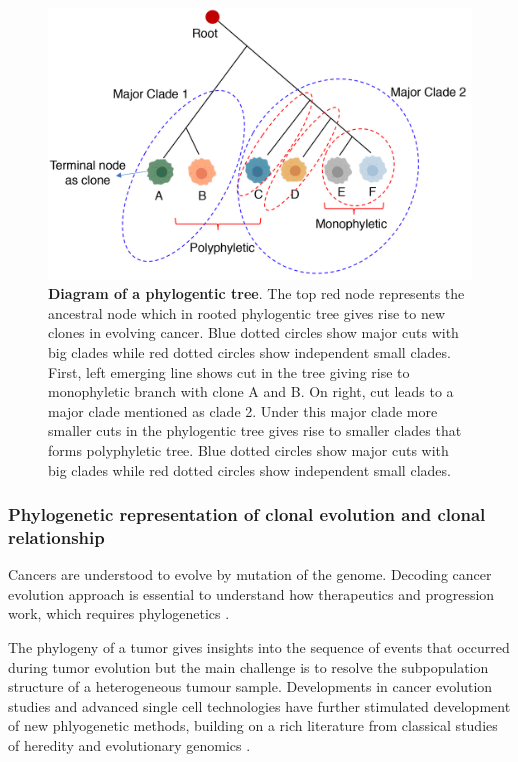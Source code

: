  \begin{figure}
\centering
\includegraphics[width=\textwidth]{Figures/chap1/phylogenetictree.png}
	\caption[Diagram of a phylogentic tree]
	{\small
	    \textbf{Diagram of a phylogentic tree}.
	 The top red node represents the ancestral node which in rooted phylogentic tree gives rise to new clones in evolving cancer.  Blue dotted circles show major cuts with big clades while red dotted circles show independent small clades. First, left emerging line shows cut in the tree giving rise to monophyletic branch with clone A and B. On right, cut leads to a major clade mentioned as clade 2. Under this major clade more smaller cuts in the phylogentic tree gives rise to smaller clades that forms polyphyletic tree. Blue dotted circles show major cuts with big clades while red dotted circles show independent small clades.
	}
	\label{fig:phylogentictree}
\end{figure}
 \subsubsection{Phylogenetic representation of clonal evolution and clonal relationship}
Cancers are understood to evolve by mutation of the genome. Decoding cancer evolution approach is essential to understand how therapeutics and progression work, which requires phylogenetics \cite{burrell2013causes, tabassum2015tumorigenesis}. 

The phylogeny of a tumor gives insights into the sequence of events that occurred during tumor evolution but the main challenge is to resolve the subpopulation structure of a heterogeneous tumour sample. Developments in cancer evolution studies and advanced single cell technologies \cite{laks2019clonal} have further  stimulated development of new phlyogenetic methods, building on a rich literature from classical studies of heredity and evolutionary genomics \cite{schwartz2017evolution}. 

